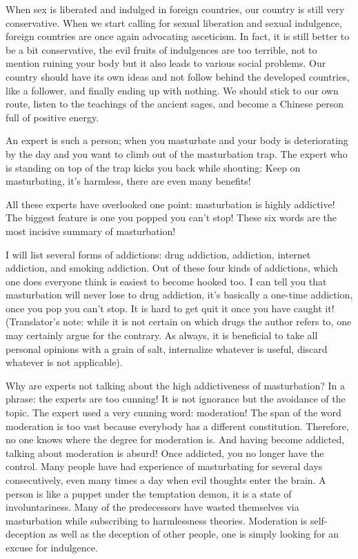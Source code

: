 \documentclass[
]{book}
\begin{document}
When sex is liberated and indulged in foreign countries, our country is still very conservative. When we start calling for sexual liberation and sexual indulgence, foreign countries are once again advocating asceticism. In fact, it is still better to be a bit conservative, the evil fruits of indulgences are too terrible, not to mention ruining your body but it also leads to various social problems. Our country should have its own ideas and not follow behind the developed countries, like a follower, and finally ending up with nothing. We should stick to our own route, listen to the teachings of the ancient sages, and become a Chinese person full of positive energy.

An expert is such a person; when you masturbate and your body is deteriorating by the day and you want to climb out of the masturbation trap. The expert who is standing on top of the trap kicks you back while shouting: Keep on masturbating, it's harmless, there are even many benefits!

All these experts have overlooked one point: masturbation is highly addictive! The biggest feature is one you popped you can't stop! These six words are the most incisive summary of masturbation!

I will list several forms of addictions: drug addiction, addiction, internet addiction, and smoking addiction. Out of these four kinds of addictions, which one does everyone think is easiest to become hooked too. I can tell you that masturbation will never lose to drug addiction, it's basically a one-time addiction, once you pop you can't stop. It is hard to get quit it once you have caught it! (Translator's note: while it is not certain on which drugs the author refers to, one may certainly argue for the contrary. As always, it is beneficial to take all personal opinions with a grain of salt, internalize whatever is useful, discard whatever is not applicable).

Why are experts not talking about the high addictiveness of masturbation? In a phrase: the experts are too cunning! It is not ignorance but the avoidance of the topic. The expert used a very cunning word: moderation! The span of the word moderation is too vast because everybody has a different constitution. Therefore, no one knows where the degree for moderation is. And having become addicted, talking about moderation is absurd! Once addicted, you no longer have the control. Many people have had experience of masturbating for several days consecutively, even many times a day when evil thoughts enter the brain. A person is like a puppet under the temptation demon, it is a state of involuntariness. Many of the predecessors have wasted themselves via masturbation while subscribing to harmlessness theories. Moderation is self-deception as well as the deception of other people, one is simply looking for an excuse for indulgence.
\end{document}
